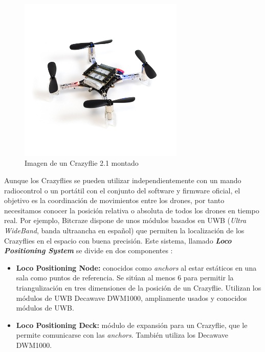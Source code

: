 \begin{figure}[h]
    \centering
    \includegraphics[trim={0 8mm 0 8mm}, clip, width=0.7\textwidth]{img/fig/fig1.1-crayzflie.jpg}
    \caption{Imagen de un Crazyflie 2.1 montado}
    \label{fig:crazyflie}
\end{figure}

Aunque los Crazyflies se pueden utilizar independientemente con un mando radiocontrol o un portátil con el conjunto del software y firmware oficial, 
el objetivo es la coordinación de movimientos entre los drones, por tanto necesitamos conocer la posición relativa o absoluta de todos los drones en tiempo real.
Por ejemplo, Bitcraze dispone de unos módulos basados en UWB (\textit{Ultra WideBand}, banda ultraancha en español) que permiten la localización de los Crazyflies en el espacio con buena precisión.
Este sistema, llamado \textit{\textbf{Loco Positioning System}} se divide en dos componentes \cite{loco_positioning_system}:

\begin{itemize}
  \item \textbf{Loco Positioning Node:} conocidos como \textit{anchors} al estar estáticos en una sala como puntos de referencia. 
  Se sitúan al menos 6 para permitir la triangulización en tres dimensiones de la posición de un Crazyflie.
  Utilizan los módulos de UWB Decawave DWM1000, ampliamente usados y conocidos módulos de UWB.
  
  \item \textbf{Loco Positioning Deck:} módulo de expansión para un Crazyflie, que le permite comunicarse con las \textit{anchors}. También utiliza los Decawave DWM1000.
\end{itemize}

